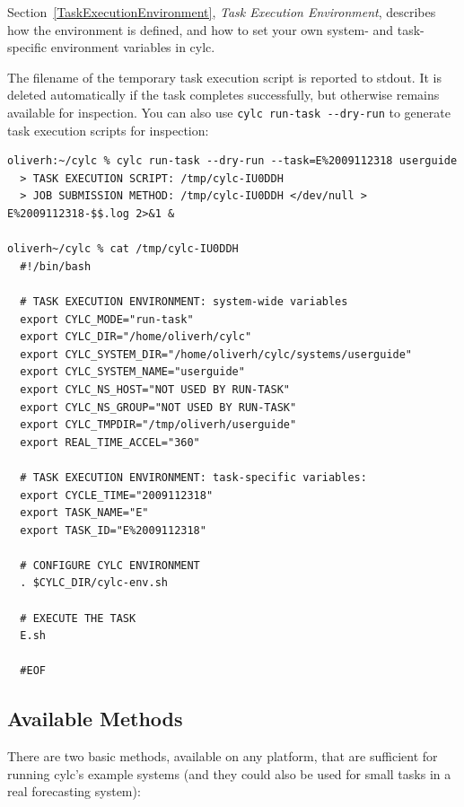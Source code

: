 \documentclass[11pt,a4paper]{article}
\begin{document}
\lstset{language=bash}

Section~\ref{TaskExecutionEnvironment}, {\em Task Execution
Environment}, describes how the environment is defined, and how to set
your own system- and task-specific environment variables in cylc.

The filename of the temporary task execution script is reported to
stdout. It is deleted automatically if the task completes successfully,
but otherwise remains available for inspection.  You can also use
\lstinline=cylc run-task --dry-run= to generate task
execution scripts for inspection:


\begin{lstlisting}
oliverh:~/cylc % cylc run-task --dry-run --task=E%2009112318 userguide
  > TASK EXECUTION SCRIPT: /tmp/cylc-IU0DDH
  > JOB SUBMISSION METHOD: /tmp/cylc-IU0DDH </dev/null > E%2009112318-$$.log 2>&1 &
  
oliverh~/cylc % cat /tmp/cylc-IU0DDH
  #!/bin/bash
  
  # TASK EXECUTION ENVIRONMENT: system-wide variables
  export CYLC_MODE="run-task"
  export CYLC_DIR="/home/oliverh/cylc"
  export CYLC_SYSTEM_DIR="/home/oliverh/cylc/systems/userguide"
  export CYLC_SYSTEM_NAME="userguide"
  export CYLC_NS_HOST="NOT USED BY RUN-TASK"
  export CYLC_NS_GROUP="NOT USED BY RUN-TASK"
  export CYLC_TMPDIR="/tmp/oliverh/userguide"
  export REAL_TIME_ACCEL="360"
  
  # TASK EXECUTION ENVIRONMENT: task-specific variables:
  export CYCLE_TIME="2009112318"
  export TASK_NAME="E"
  export TASK_ID="E%2009112318"
  
  # CONFIGURE CYLC ENVIRONMENT
  . $CYLC_DIR/cylc-env.sh
  
  # EXECUTE THE TASK
  E.sh 
  
  #EOF
\end{lstlisting}

\subsection{Available Methods}
\label{AvailableMethods}

\lstset{language=bash}

There are two basic methods, available on any platform, that are
sufficient for running cylc's example systems (and they could also be
used for small tasks in a real forecasting system): 
\end{document}
